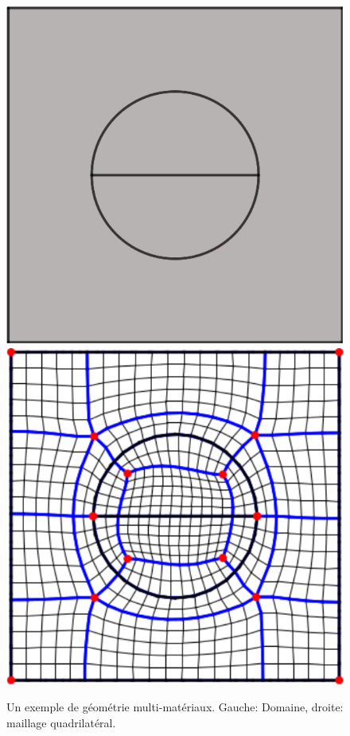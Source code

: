 \begin{figure}[!h]
\centering
\includegraphics[scale=0.535]{images/carreDiscPleinCouper domain.pdf}\hfill
\includegraphics[scale=0.8]{images/mesh_quad_6.pdf}
\caption{Un exemple de géométrie multi-matériaux. Gauche: Domaine, droite: maillage quadrilatéral.}
\label{connexe3}
\end{figure}



